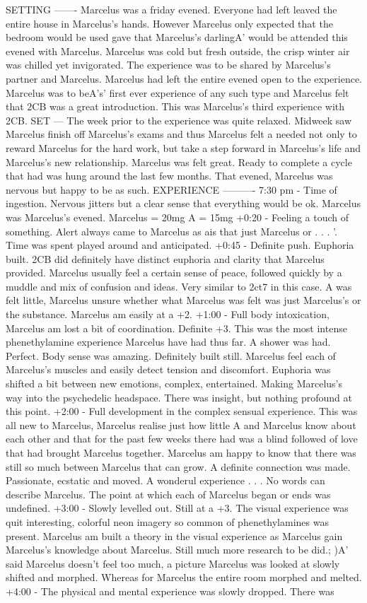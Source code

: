 \documentclass[12pt]{book}
\begin{document}
SETTING ------- Marcelus was a friday evened. Everyone had left leaved the entire house in Marcelus's hands. However Marcelus only expected that the bedroom would be used gave that Marcelus's darlingA' would be attended this evened with Marcelus. Marcelus was cold but fresh outside, the crisp winter air was chilled yet invigorated. The experience was to be shared by Marcelus's partner and Marcelus. Marcelus had left the entire evened open to the experience. Marcelus was to beA's' first ever experience of any such type and Marcelus felt that 2CB was a great introduction. This was Marcelus's third experience with 2CB. SET --- The week prior to the experience was quite relaxed. Midweek saw Marcelus finish off Marcelus's exams and thus Marcelus felt a needed not only to reward Marcelus for the hard work, but take a step forward in Marcelus's life and Marcelus's new relationship. Marcelus was felt great. Ready to complete a cycle that had was hung around the last few months. That evened, Marcelus was nervous but happy to be as such. EXPERIENCE ---------- 7:30 pm - Time of ingestion. Nervous jitters but a clear sense that everything would be ok. Marcelus was Marcelus's evened. Marcelus = 20mg A = 15mg +0:20 - Feeling a touch of something. Alert always came to Marcelus as ais that just Marcelus or . . .  '. Time was spent played around and anticipated. +0:45 - Definite push. Euphoria built. 2CB did definitely have distinct euphoria and clarity that Marcelus provided. Marcelus usually feel a certain sense of peace, followed quickly by a muddle and mix of confusion and ideas. Very similar to 2ct7 in this case. A was felt little, Marcelus unsure whether what Marcelus was felt was just Marcelus's or the substance. Marcelus am easily at a +2. +1:00 - Full body intoxication, Marcelus am lost a bit of coordination. Definite +3. This was the most intense phenethylamine experience Marcelus have had thus far. A shower was had. Perfect. Body sense was amazing. Definitely built still. Marcelus feel each of Marcelus's muscles and easily detect tension and discomfort. Euphoria was shifted a bit between new emotions, complex, entertained. Making Marcelus's way into the psychedelic headspace. There was insight, but nothing profound at this point. +2:00 - Full development in the complex sensual experience. This was all new to Marcelus, Marcelus realise just how little A and Marcelus know about each other and that for the past few weeks there had was a blind followed of love that had brought Marcelus together. Marcelus am happy to know that there was still so much between Marcelus that can grow. A definite connection was made. Passionate, ecstatic and moved. A wonderul experience . . .  No words can describe Marcelus. The point at which each of Marcelus began or ends was undefined. +3:00 - Slowly levelled out. Still at a +3. The visual experience was quit interesting, colorful neon imagery so common of phenethylamines was present. Marcelus am built a theory in the visual experience as Marcelus gain Marcelus's knowledge about Marcelus. Still much more research to be did.; )A' said Marcelus doesn't feel too much, a picture Marcelus was looked at slowly shifted and morphed. Whereas for Marcelus the entire room morphed and melted. +4:00 - The physical and mental experience was slowly dropped. There was 
\end{document}
